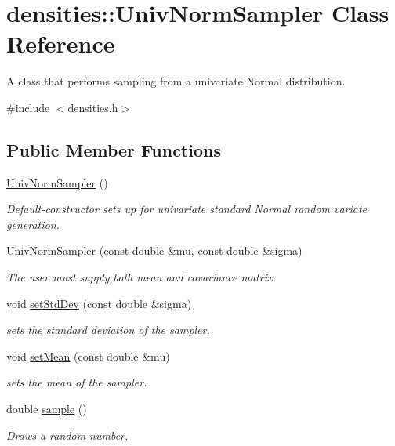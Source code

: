 \hypertarget{classdensities_1_1UnivNormSampler}{}\section{densities\+:\+:Univ\+Norm\+Sampler Class Reference}
\label{classdensities_1_1UnivNormSampler}


A class that performs sampling from a univariate Normal distribution.  




{\ttfamily \#include $<$densities.\+h$>$}

\subsection*{Public Member Functions}
\begin{DoxyCompactItemize}
\item 
\hyperlink{classdensities_1_1UnivNormSampler_a1e81031b8312d7dee9a9d8f08d17d13a}{Univ\+Norm\+Sampler} ()\hypertarget{classdensities_1_1UnivNormSampler_a1e81031b8312d7dee9a9d8f08d17d13a}{}\label{classdensities_1_1UnivNormSampler_a1e81031b8312d7dee9a9d8f08d17d13a}

\begin{DoxyCompactList}\small\item\em Default-\/constructor sets up for univariate standard Normal random variate generation. \end{DoxyCompactList}\item 
\hyperlink{classdensities_1_1UnivNormSampler_a0284d90980b4cb8d9957e00af11c71e1}{Univ\+Norm\+Sampler} (const double \&mu, const double \&sigma)
\begin{DoxyCompactList}\small\item\em The user must supply both mean and covariance matrix. \end{DoxyCompactList}\item 
void \hyperlink{classdensities_1_1UnivNormSampler_ac579e126a9f884f334d58b29c408ceaa}{set\+Std\+Dev} (const double \&sigma)
\begin{DoxyCompactList}\small\item\em sets the standard deviation of the sampler. \end{DoxyCompactList}\item 
void \hyperlink{classdensities_1_1UnivNormSampler_a7c51871a59537bf5b14376e7e78cea4a}{set\+Mean} (const double \&mu)
\begin{DoxyCompactList}\small\item\em sets the mean of the sampler. \end{DoxyCompactList}\item 
double \hyperlink{classdensities_1_1UnivNormSampler_a95fe7880a41fad1b7d96f3ed22d35b33}{sample} ()
\begin{DoxyCompactList}\small\item\em Draws a random number. \end{DoxyCompactList}\end{DoxyCompactItemize}


